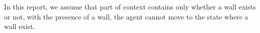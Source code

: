 In this report, we assume that part of context contains only whether a wall exists or not, with the presence of a wall, the agent cannot move to the state where a wall exist.




